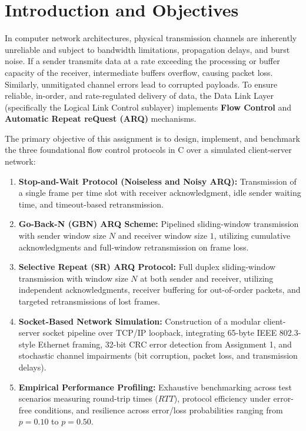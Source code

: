 \documentclass[11pt,a4paper]{article}
\begin{document}
\section{Introduction and Objectives}

In computer network architectures, physical transmission channels are inherently unreliable and subject to bandwidth limitations, propagation delays, and burst noise. If a sender transmits data at a rate exceeding the processing or buffer capacity of the receiver, intermediate buffers overflow, causing packet loss. Similarly, unmitigated channel errors lead to corrupted payloads. To ensure reliable, in-order, and rate-regulated delivery of data, the Data Link Layer (specifically the Logical Link Control sublayer) implements \textbf{Flow Control} and \textbf{Automatic Repeat reQuest (ARQ)} mechanisms.

The primary objective of this assignment is to design, implement, and benchmark the three foundational flow control protocols in C over a simulated client-server network:
\begin{enumerate}
    \item \textbf{Stop-and-Wait Protocol (Noiseless and Noisy ARQ):} Transmission of a single frame per time slot with receiver acknowledgment, idle sender waiting time, and timeout-based retransmission.
    \item \textbf{Go-Back-N (GBN) ARQ Scheme:} Pipelined sliding-window transmission with sender window size \(N\) and receiver window size \(1\), utilizing cumulative acknowledgments and full-window retransmission on frame loss.
    \item \textbf{Selective Repeat (SR) ARQ Protocol:} Full duplex sliding-window transmission with window size \(N\) at both sender and receiver, utilizing independent acknowledgments, receiver buffering for out-of-order packets, and targeted retransmissions of lost frames.
    \item \textbf{Socket-Based Network Simulation:} Construction of a modular client-server socket pipeline over TCP/IP loopback, integrating 65-byte IEEE 802.3-style Ethernet framing, 32-bit CRC error detection from Assignment 1, and stochastic channel impairments (bit corruption, packet loss, and transmission delays).
    \item \textbf{Empirical Performance Profiling:} Exhaustive benchmarking across test scenarios measuring round-trip times (\(RTT\)), protocol efficiency under error-free conditions, and resilience across error/loss probabilities ranging from \(p = 0.10\) to \(p = 0.50\).
\end{enumerate}
\end{document}
